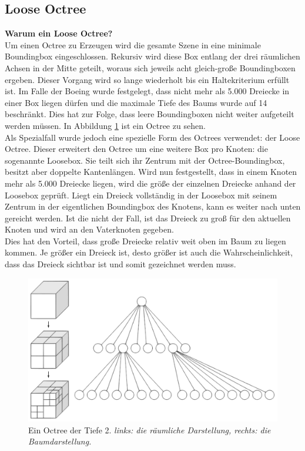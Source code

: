 \subsection{Loose Octree}
\label{sec:basics:octree}
\textbf{Warum ein Loose Octree?}\\
Um einen Octree \cite{RTR3} zu Erzeugen wird die gesamte Szene in eine minimale Boundingbox eingeschlossen. Rekursiv wird diese Box entlang der drei räumlichen Achsen in der Mitte geteilt, woraus sich jeweils acht gleich-große Boundingboxen ergeben. Dieser Vorgang wird so lange wiederholt bis ein Haltekriterium erfüllt ist. Im Falle der Boeing wurde festgelegt, dass nicht mehr als 5.000 Dreiecke in einer Box liegen dürfen und die maximale Tiefe des Baums wurde auf 14 beschränkt. Dies hat zur Folge, dass leere Boundingboxen nicht weiter aufgeteilt werden müssen. In Abbildung \ref{fig:basics:octree} ist ein Octree zu sehen.\\
Als Spezialfall wurde jedoch eine spezielle Form des Octrees verwendet: der Loose Octree. Dieser erweitert den Octree um eine weitere Box pro Knoten: die sogenannte Loosebox. Sie teilt sich ihr Zentrum mit der Octree-Boundingbox, besitzt aber doppelte Kantenlängen. Wird nun festgestellt, dass in einem Knoten mehr als 5.000 Dreiecke liegen, wird die größe der einzelnen Dreiecke anhand der Loosebox geprüft. Liegt ein Dreieck vollständig in der Loosebox mit seinem Zentrum in der eigentlichen Boundingbox des Knotens, kann es weiter nach unten gereicht werden. Ist die nicht der Fall, ist das Dreieck zu groß für den aktuellen Knoten und wird an den Vaterknoten gegeben.\\
Dies hat den Vorteil, dass große Dreiecke relativ weit oben im Baum zu liegen kommen. Je größer ein Dreieck ist, desto größer ist auch die Wahrscheinlichkeit, dass das Dreieck sichtbar ist und somit gezeichnet werden muss.

\begin{figure}
 \centering
  \includegraphics[scale=0.5]{images/octree.pdf}
  \caption{Ein Octree der Tiefe 2. \textit{links: die räumliche Darstellung, rechts: die Baumdarstellung.}}
 \label{fig:basics:octree}
\end{figure}

